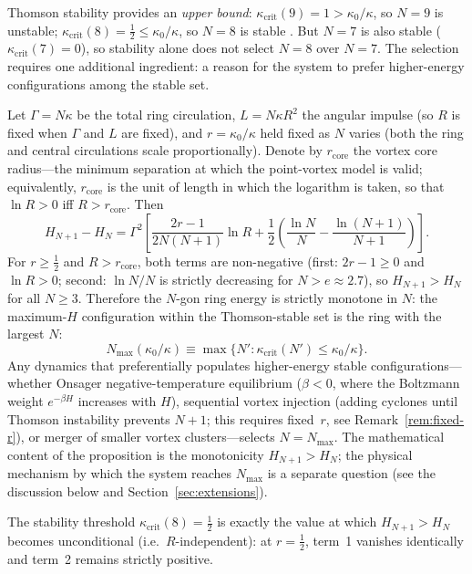 Thomson stability provides an \emph{upper bound}:
$\kappa_{\mathrm{crit}}(9) = 1 > \kappa_0/\kappa$,
so $N = 9$ is unstable; $\kappa_{\mathrm{crit}}(8) = \tfrac{1}{2}
\le \kappa_0/\kappa$, so $N = 8$ is stable \citep{Adriani2018}.
But $N = 7$ is also stable ($\kappa_{\mathrm{crit}}(7) = 0$), so
stability alone does not select $N = 8$ over $N = 7$.
The selection requires one additional ingredient: a reason for the
system to prefer higher-energy configurations among the stable set.

\begin{proposition}\label{prop:onsager-n-select}
Let $\Gamma = N\kappa$ be the total ring circulation, $L = N\kappa R^2$
the angular impulse (so $R$ is fixed when $\Gamma$ and $L$ are fixed),
and $r = \kappa_0/\kappa$ held fixed as $N$ varies (both the ring and
central circulations scale proportionally).  Denote by
$r_{\mathrm{core}}$ the vortex core radius---the minimum separation at
which the point-vortex model is valid; equivalently, $r_{\mathrm{core}}$
is the unit of length in which the logarithm is taken, so that
$\ln R > 0$ iff $R > r_{\mathrm{core}}$.  Then
\begin{equation}\label{eq:H-monotone}
  H_{N+1} - H_N = \Gamma^2\!\left[\frac{2r-1}{2N(N+1)}\ln R
    + \frac12\!\left(\frac{\ln N}{N} - \frac{\ln(N+1)}{N+1}\right)\right].
\end{equation}
For $r \ge \tfrac{1}{2}$ and $R > r_{\mathrm{core}}$, both terms
are non-negative (first: $2r - 1 \ge 0$ and $\ln R > 0$; second:
$\ln N/N$ is strictly decreasing for $N > e \approx 2.7$), so
$H_{N+1} > H_N$ for all $N \ge 3$.  Therefore the $N$-gon ring
energy is strictly monotone in $N$: the maximum-$H$ configuration
within the Thomson-stable set is the ring with the largest $N$:
\[
  N_{\max}(\kappa_0/\kappa)
    \equiv \max\bigl\{N' : \kappa_{\mathrm{crit}}(N') \le \kappa_0/\kappa\bigr\}.
\]
Any dynamics that preferentially populates higher-energy stable
configurations---whether Onsager negative-temperature equilibrium
($\beta < 0$, where the Boltzmann weight $e^{-\beta H}$ increases
with $H$), sequential vortex injection (adding cyclones until
Thomson instability prevents $N{+}1$; this requires fixed~$r$,
see Remark~\ref{rem:fixed-r}), or merger of smaller vortex
clusters---selects $N = N_{\max}$.  The mathematical content of the
proposition is the monotonicity $H_{N+1} > H_N$; the physical
mechanism by which the system reaches $N_{\max}$ is a separate
question (see the discussion below and Section~\ref{sec:extensions}).

The stability threshold $\kappa_{\mathrm{crit}}(8) = \tfrac{1}{2}$ is
exactly the value at which $H_{N+1} > H_N$ becomes unconditional (i.e.\
$R$-independent): at $r = \tfrac{1}{2}$, term~1 vanishes identically
and term~2 remains strictly positive.
\end{proposition}
